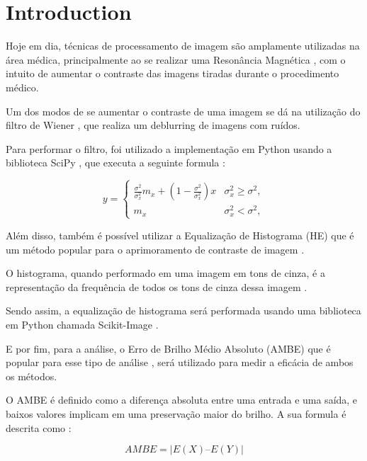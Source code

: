 \documentclass[conference]{IEEEtran}
\begin{document}
\section{Introduction}

Hoje em dia, técnicas de processamento de imagem são amplamente utilizadas na área médica, principalmente ao se realizar uma Resonância Magnética \cite{b1}, com o intuito de aumentar o contraste das imagens tiradas durante o procedimento médico.

Um dos modos de se aumentar o contraste de uma imagem se dá na utilização do filtro de Wiener \cite{b2}, que realiza um deblurring de imagens com ruídos.

Para performar o filtro, foi utilizado a implementação em Python usando a biblioteca SciPy \cite{b3}, que executa a seguinte formula \cite{b4} :

\begin{equation}
y=\left\{ \begin{array}{cc} \frac{\sigma^{2}}{\sigma_{x}^{2}}m_{x}+\left(1-\frac{\sigma^{2}}{\sigma_{x}^{2}}\right)x & \sigma_{x}^{2}\geq\sigma^{2},\\ m_{x} & \sigma_{x}^{2}<\sigma^{2},\end{array}\right.
\end{equation}

Além disso, também é possível utilizar a Equalização de Histograma (HE) que é um método popular para o aprimoramento de contraste de imagem \cite{b5} \cite{b6} \cite{b7}.

O histograma, quando performado em uma imagem em tons de cinza, é a representação da frequência de todos os tons de cinza dessa imagem \cite{b8}.

Sendo assim, a equalização de histograma será performada usando uma biblioteca em Python chamada Scikit-Image \cite{b9}.

E por fim, para a análise, o Erro de Brilho Médio Absoluto (AMBE) que é popular para esse tipo de análise \cite{10}, será utilizado para medir a eficácia de ambos os métodos.

O AMBE é definido como a diferença absoluta entre uma entrada e uma saída, e baixos valores implicam em uma preservação maior do brilho. A sua formula é descrita como \cite{11}:

\begin{equation}
AMBE=|E(X) – E(Y)|     
\end{equation}
\end{document}
